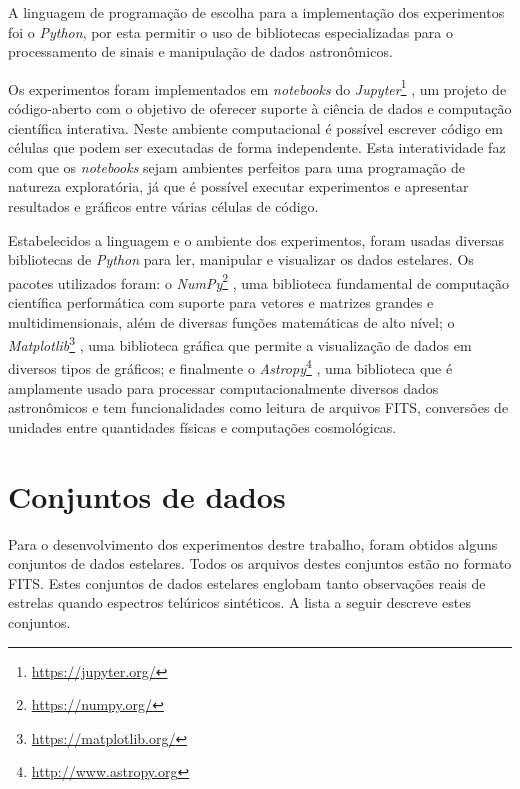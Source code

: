 A linguagem de programação de escolha para a implementação dos experimentos foi o \textit{Python}, por esta permitir o uso de bibliotecas especializadas para o processamento de sinais e manipulação de dados astronômicos.

Os experimentos foram implementados em \textit{notebooks} do \textit{Jupyter}\footnote{\url{https://jupyter.org/}} \citep{Kluyver:2016aa}, um projeto de código-aberto com o objetivo de oferecer suporte à ciência de dados e computação científica interativa. Neste ambiente computacional é possível escrever código em células que podem ser executadas de forma independente. Esta interatividade faz com que os \textit{notebooks} sejam ambientes perfeitos para uma programação de natureza exploratória, já que é possível executar experimentos e apresentar resultados e gráficos entre várias células de código.

Estabelecidos a linguagem e o ambiente dos experimentos, foram usadas diversas bibliotecas de \textit{Python} para ler, manipular e visualizar os dados estelares. Os pacotes utilizados foram: o \textit{NumPy}\footnote{\url{https://numpy.org/}} \citep{oliphant2006guide}, uma biblioteca fundamental de computação científica performática com suporte para vetores e matrizes grandes e multidimensionais, além de diversas funções matemáticas de alto nível; o \textit{Matplotlib}\footnote{\url{https://matplotlib.org/}} \citep{Hunter:2007}, uma biblioteca gráfica que permite a visualização de dados em diversos tipos de gráficos; e finalmente o \textit{Astropy}\footnote{\url{http://www.astropy.org}} \citep{astropy:2018}, uma biblioteca que é amplamente usado para processar computacionalmente diversos dados astronômicos e tem funcionalidades como leitura de arquivos FITS, conversões de unidades entre quantidades físicas e computações cosmológicas.

\section{Conjuntos de dados}

Para o desenvolvimento dos experimentos destre trabalho, foram obtidos alguns conjuntos de dados estelares. Todos os arquivos destes conjuntos estão no formato FITS. Estes conjuntos de dados estelares englobam tanto observações reais de estrelas quando espectros telúricos sintéticos. A lista a seguir descreve estes conjuntos.

